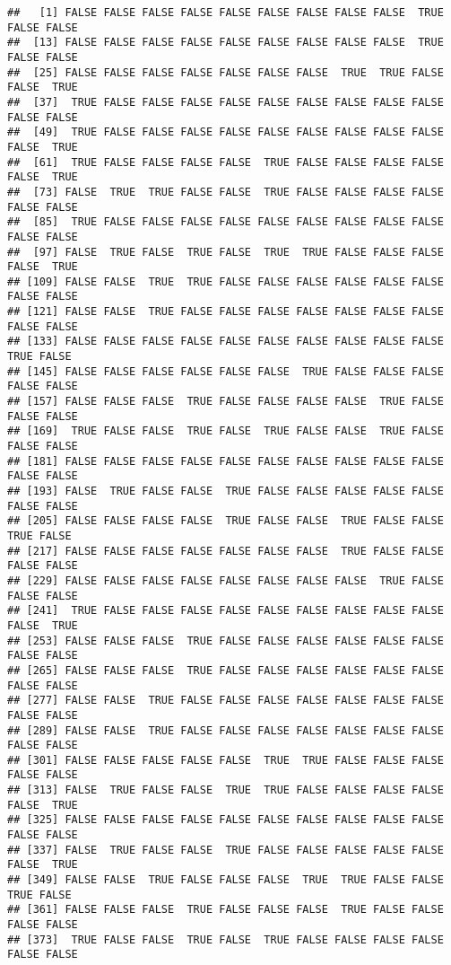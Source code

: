 \documentclass[
]{book}
\begin{document}
\begin{verbatim}
##   [1] FALSE FALSE FALSE FALSE FALSE FALSE FALSE FALSE FALSE  TRUE FALSE FALSE
##  [13] FALSE FALSE FALSE FALSE FALSE FALSE FALSE FALSE FALSE  TRUE FALSE FALSE
##  [25] FALSE FALSE FALSE FALSE FALSE FALSE FALSE  TRUE  TRUE FALSE FALSE  TRUE
##  [37]  TRUE FALSE FALSE FALSE FALSE FALSE FALSE FALSE FALSE FALSE FALSE FALSE
##  [49]  TRUE FALSE FALSE FALSE FALSE FALSE FALSE FALSE FALSE FALSE FALSE  TRUE
##  [61]  TRUE FALSE FALSE FALSE FALSE  TRUE FALSE FALSE FALSE FALSE FALSE  TRUE
##  [73] FALSE  TRUE  TRUE FALSE FALSE  TRUE FALSE FALSE FALSE FALSE FALSE FALSE
##  [85]  TRUE FALSE FALSE FALSE FALSE FALSE FALSE FALSE FALSE FALSE FALSE FALSE
##  [97] FALSE  TRUE FALSE  TRUE FALSE  TRUE  TRUE FALSE FALSE FALSE FALSE  TRUE
## [109] FALSE FALSE  TRUE  TRUE FALSE FALSE FALSE FALSE FALSE FALSE FALSE FALSE
## [121] FALSE FALSE  TRUE FALSE FALSE FALSE FALSE FALSE FALSE FALSE FALSE FALSE
## [133] FALSE FALSE FALSE FALSE FALSE FALSE FALSE FALSE FALSE FALSE  TRUE FALSE
## [145] FALSE FALSE FALSE FALSE FALSE FALSE  TRUE FALSE FALSE FALSE FALSE FALSE
## [157] FALSE FALSE FALSE  TRUE FALSE FALSE FALSE FALSE  TRUE FALSE FALSE FALSE
## [169]  TRUE FALSE FALSE  TRUE FALSE  TRUE FALSE FALSE  TRUE FALSE FALSE FALSE
## [181] FALSE FALSE FALSE FALSE FALSE FALSE FALSE FALSE FALSE FALSE FALSE FALSE
## [193] FALSE  TRUE FALSE FALSE  TRUE FALSE FALSE FALSE FALSE FALSE FALSE FALSE
## [205] FALSE FALSE FALSE FALSE  TRUE FALSE FALSE  TRUE FALSE FALSE  TRUE FALSE
## [217] FALSE FALSE FALSE FALSE FALSE FALSE FALSE  TRUE FALSE FALSE FALSE FALSE
## [229] FALSE FALSE FALSE FALSE FALSE FALSE FALSE FALSE  TRUE FALSE FALSE FALSE
## [241]  TRUE FALSE FALSE FALSE FALSE FALSE FALSE FALSE FALSE FALSE FALSE  TRUE
## [253] FALSE FALSE FALSE  TRUE FALSE FALSE FALSE FALSE FALSE FALSE FALSE FALSE
## [265] FALSE FALSE FALSE  TRUE FALSE FALSE FALSE FALSE FALSE FALSE FALSE FALSE
## [277] FALSE FALSE  TRUE FALSE FALSE FALSE FALSE FALSE FALSE FALSE FALSE FALSE
## [289] FALSE FALSE  TRUE FALSE FALSE FALSE FALSE FALSE FALSE FALSE FALSE FALSE
## [301] FALSE FALSE FALSE FALSE FALSE  TRUE  TRUE FALSE FALSE FALSE FALSE FALSE
## [313] FALSE  TRUE FALSE FALSE  TRUE  TRUE FALSE FALSE FALSE FALSE FALSE  TRUE
## [325] FALSE FALSE FALSE FALSE FALSE FALSE FALSE FALSE FALSE FALSE FALSE FALSE
## [337] FALSE  TRUE FALSE FALSE  TRUE FALSE FALSE FALSE FALSE FALSE FALSE  TRUE
## [349] FALSE FALSE  TRUE FALSE FALSE FALSE  TRUE  TRUE FALSE FALSE  TRUE FALSE
## [361] FALSE FALSE FALSE  TRUE FALSE FALSE FALSE  TRUE FALSE FALSE FALSE FALSE
## [373]  TRUE FALSE FALSE  TRUE FALSE  TRUE FALSE FALSE FALSE FALSE FALSE FALSE

\end{verbatim}
\end{document}
